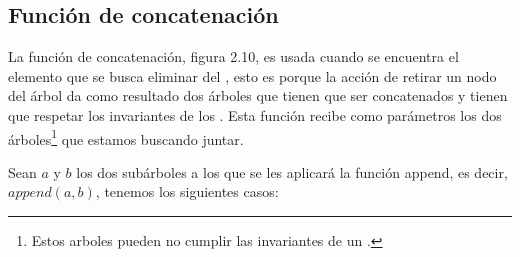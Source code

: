\subsection{Funci\'on de concatenaci\'on}

La funci\'on de concatenación, figura 2.10, es usada cuando se encuentra el elemento que se busca
eliminar del {\arn}, esto es porque la acci\'on de retirar un nodo del \'arbol da como resultado
dos \'arboles que tienen que ser concatenados y tienen que respetar los invariantes de los {\arns}
. Esta funci\'on recibe como parámetros los dos \'arboles\footnote{Estos arboles pueden no cumplir
las invariantes de un {\arn}.} que estamos buscando juntar.

Sean $a$ y $b$ los dos subárboles a los que se les aplicar\'a la funci\'on append, es decir,
$append(a,b)$, tenemos los siguientes casos:

